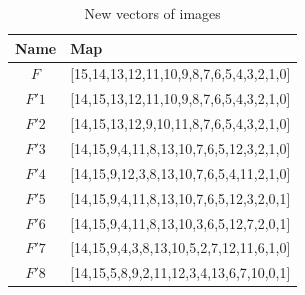 \begin{table}
\centering
\begin{tabular}{|c|l|}
\hline
Name & Map \\
\hline
$F$&[15,14,13,12,11,10,9,8,7,6,5,4,3,2,1,0]\\
\hline
$F'1$&[14,15,13,12,11,10,9,8,7,6,5,4,3,2,1,0]\\
\hline
$F'2$&[14,15,13,12,9,10,11,8,7,6,5,4,3,2,1,0]\\
\hline
$F'3$&[14,15,9,4,11,8,13,10,7,6,5,12,3,2,1,0]\\
\hline
$F'4$&[14,15,9,12,3,8,13,10,7,6,5,4,11,2,1,0]\\
\hline
$F'5$&[14,15,9,4,11,8,13,10,7,6,5,12,3,2,0,1]\\
\hline
$F'6$&[14,15,9,4,11,8,13,10,3,6,5,12,7,2,0,1]\\
\hline
$F'7$&[14,15,9,4,3,8,13,10,5,2,7,12,11,6,1,0]\\
\hline
$F'8$&[14,15,5,8,9,2,11,12,3,4,13,6,7,10,0,1]\\
\hline
\end{tabular}
\caption{New vectors of images}
\label{New vectors of images}
\end{table}

